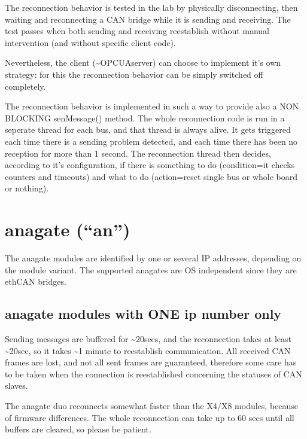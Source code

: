\documentclass[a4paper,10pt,english]{sphinxmanual}
\begin{document}
\sphinxAtStartPar
The reconnection behavior is tested in the lab by physically disconnecting, then waiting
and reconnecting a CAN bridge while it is sending and receiving. The test passes when
both sending and receiving reestablish without manual intervention (and without specific client code).

\sphinxAtStartPar
Nevertheless, the client (\textasciitilde{}OPCUAserver) can choose to implement it’s own strategy: for this
the reconnection behavior can be simply switched off completely.

\sphinxAtStartPar
The reconnection behavior is implemented in such a way to provide also a NON BLOCKING senMessage() method.
The whole reconnection code is run in a seperate thread for each bus, and that thread is always alive. It gets
triggered each time there is a sending problem detected, and each time there has been no reception for more than 1 second.
The reconnection thread then decides, according to it’s configuration, if there is something to do (condition=it checks
counters and timeouts) and what to do (action=reset single bus or whole board or nothing).


\section{anagate (“an”)}
\label{\detokenize{reconnection:anagate-an}}
\sphinxAtStartPar
The anagate modules are identified by one or several IP addresses, depending on the module variant.
The supported anagates are OS independent since they are eth\sphinxhyphen{}CAN bridges.


\subsection{anagate modules with ONE ip number only}
\label{\detokenize{reconnection:anagate-modules-with-one-ip-number-only}}
\sphinxAtStartPar
Sending messages are buffered for \textasciitilde{}20secs, and the reconnection
takes at least \textasciitilde{}20sec, so it takes \textasciitilde{}1 minute to reestablish communication. All received CAN frames
are lost, and not all sent frames are guaranteed, therefore some care has to be taken when the
connection is reestablished concerning the statuses of CAN slaves.

\sphinxAtStartPar
The anagate duo reconnects somewhat faster than the X4/X8 modules, because of firmware differences.
The whole reconnection can take up to 60 secs until all buffers are cleared, so please be patient.
\end{document}
